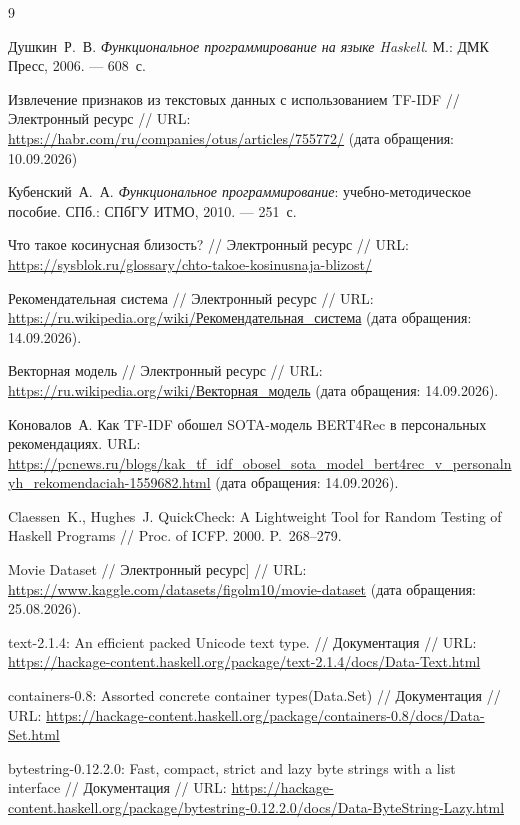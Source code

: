 \documentclass[a4paper, 16pt]{article}
\begin{document}
\newpage
\begin{thebibliography}{9}

Душкин~Р.~В.
\textit{Функциональное программирование на языке Haskell}.
М.: ДМК Пресс, 2006. --- 608~с.

Извлечение признаков из текстовых данных с использованием TF-IDF // Электронный ресурс // URL: \url{https://habr.com/ru/companies/otus/articles/755772/} (дата обращения: 10.09.2026)


Кубенский~А.~А.
\textit{Функциональное программирование}: учебно-методическое пособие.
СПб.: СПбГУ ИТМО, 2010. --- 251~с.

Что такое косинусная близость? // Электронный ресурс // 
URL: \url{https://sysblok.ru/glossary/chto-takoe-kosinusnaja-blizost/}

Рекомендательная система // Электронный ресурс // 
URL: \url{https://ru.wikipedia.org/wiki/Рекомендательная_система}
(дата обращения: 14.09.2026).

Векторная модель // Электронный ресурс //
URL: \url{https://ru.wikipedia.org/wiki/Векторная_модель}
(дата обращения: 14.09.2026).

Коновалов~А.
Как TF-IDF обошел SOTA-модель BERT4Rec в персональных рекомендациях.
URL: \url{https://pcnews.ru/blogs/kak_tf_idf_obosel_sota_model_bert4rec_v_personalnyh_rekomendaciah-1559682.html}
(дата обращения: 14.09.2026).

Claessen~K., Hughes~J.
QuickCheck: A Lightweight Tool for Random Testing of Haskell Programs //
Proc. of ICFP. 2000. P.~268--279.

Movie Dataset // Электронный ресурс] //
URL: \url{https://www.kaggle.com/datasets/figolm10/movie-dataset}
(дата обращения: 25.08.2026).

text-2.1.4: An efficient packed Unicode text type. // Документация //
URL: \url{https://hackage-content.haskell.org/package/text-2.1.4/docs/Data-Text.html}

containers-0.8: Assorted concrete container types(Data.Set) // Документация //
URL: \url{https://hackage-content.haskell.org/package/containers-0.8/docs/Data-Set.html}

bytestring-0.12.2.0: Fast, compact, strict and lazy byte strings with a list interface // Документация // 
URL: \url{https://hackage-content.haskell.org/package/bytestring-0.12.2.0/docs/Data-ByteString-Lazy.html}


\end{thebibliography}
\end{document}
